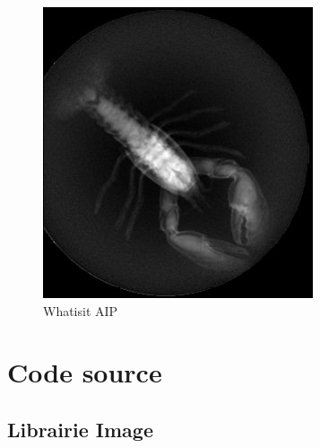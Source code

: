 \documentclass[a4paper,11pt]{article}
\begin{document}
\begin{figure}[!h]
 \center
\includegraphics[scale=0.7]{whatisit.jpg}
\caption{Whatisit AIP}
\end{figure}

\section{Code source}
\subsection{Librairie Image}
\end{document}
